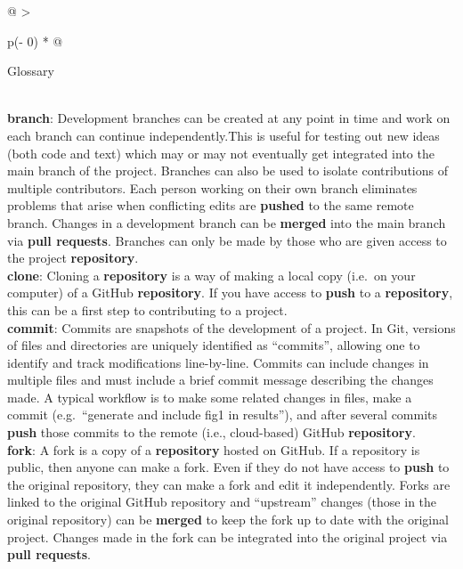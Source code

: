 \begin{tablenos:no-prefix-table-caption}

\begin{longtable}[]{@{}
  >{\raggedright\arraybackslash}p{(\columnwidth - 0\tabcolsep) * }@{}}
\toprule
\begin{minipage}[b]{\linewidth}\raggedright
Glossary
\end{minipage} \\
\midrule
\endhead
\textbf{branch}: Development branches can be created at any point in time and work on each branch can continue independently.This is useful for testing out new ideas (both code and text) which may or may not eventually get integrated into the main branch of the project. Branches can also be used to isolate contributions of multiple contributors. Each person working on their own branch eliminates problems that arise when conflicting edits are \textbf{pushed} to the same remote branch. Changes in a development branch can be \textbf{merged} into the main branch via \textbf{pull requests}. Branches can only be made by those who are given access to the project \textbf{repository}. \\
\textbf{clone}: Cloning a \textbf{repository} is a way of making a local copy (i.e.~on your computer) of a GitHub \textbf{repository}. If you have access to \textbf{push} to a \textbf{repository}, this can be a first step to contributing to a project. \\
\textbf{commit}: Commits are snapshots of the development of a project. In Git, versions of files and directories are uniquely identified as ``commits'', allowing one to identify and track modifications line-by-line. Commits can include changes in multiple files and must include a brief commit message describing the changes made. A typical workflow is to make some related changes in files, make a commit (e.g.~``generate and include fig1 in results''), and after several commits \textbf{push} those commits to the remote (i.e., cloud-based) GitHub \textbf{repository}. \\
\textbf{fork}: A fork is a copy of a \textbf{repository} hosted on GitHub. If a repository is public, then anyone can make a fork. Even if they do not have access to \textbf{push} to the original repository, they can make a fork and edit it independently. Forks are linked to the original GitHub repository and ``upstream'' changes (those in the original repository) can be \textbf{merged} to keep the fork up to date with the original project. Changes made in the fork can be integrated into the original project via \textbf{pull requests}. \\

\end{longtable}
\end{tablenos:no-prefix-table-caption}

